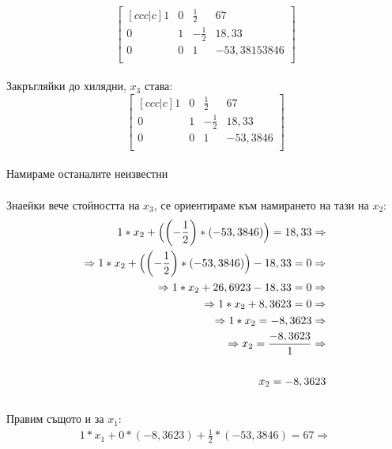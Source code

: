 \documentclass[12pt, a4paper]{article}
\begin{document}
\begin{enumerate}
{				\begin{equation}
					\begin{bmatrix}[ccc|c]
						1 & 0 & \frac{1}{2} & 67\\
						0 & 1 & -\frac{1}{2} & 18,33\\
						0 & 0 & 1 & -53,38153846\\
					\end{bmatrix}
				\end{equation}\\
				Закръгляйки до хилядни, $x_3$ става:
				\begin{equation}
					\begin{bmatrix}[ccc|c]
						1 & 0 & \frac{1}{2} & 67\\
						0 & 1 & -\frac{1}{2} & 18,33\\
						0 & 0 & 1 & -53,3846\\
					\end{bmatrix}
				\end{equation}\\
				\newpage
				Намираме останалите неизвестни\\\\
				Знаейки вече стойността на $x_3$, се ориентираме към намирането на тази на $x_2$:\\
				\begin{equation}
					 \begin{split}
					 	1 * x_2 + \Bigl(\biggl(-\frac{1}{2}\biggr) * (-53,3846)\Bigr) = 18,33\Rightarrow\\
					 	\Rightarrow1 * x_2 + \Bigl(\biggl(-\frac{1}{2}\biggr) * (-53,3846)\Bigr) - 18,33 = 0\Rightarrow\\
					 	\Rightarrow1 * x_2 + 26,6923 - 18,33 = 0\Rightarrow\\
					 	\Rightarrow1 * x_2 + 8,3623 = 0\Rightarrow\\
					 	\Rightarrow1 * x_2 = -8,3623\Rightarrow\\
					 	\Rightarrow x_2 = \frac{-8,3623}{1}\Rightarrow\\\\
					 	 x_2 = -8,3623
					 \end{split}
				\end{equation}\\
				Правим същото и за $x_1$:\\
				\begin{equation}
					\begin{split}
						1 * x_1 + 0 * (-8,3623) + \frac{1}{2} * (-53,3846) = 67\Rightarrow\\\\

\end{split}
\end{equation}}
\end{enumerate}
\end{document}
